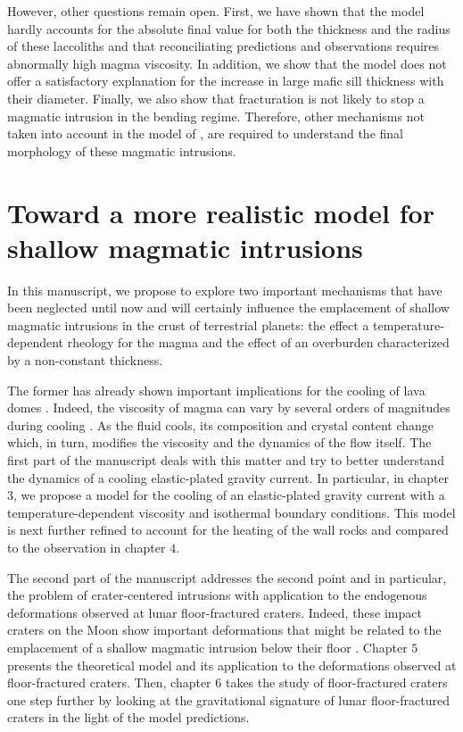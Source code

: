 However, other questions  remain open.  First, we have  shown that the
model  hardly accounts  for  the  absolute final  value  for both  the
thickness and the  radius of these laccoliths  and that reconciliating
predictions and observations requires abnormally high magma viscosity.
In addition,  we show  that the  model does  not offer  a satisfactory
explanation for the increase in  large mafic sill thickness with their
diameter. Finally,  we also  show that fracturation  is not  likely to
stop  a magmatic  intrusion in  the bending  regime. Therefore,  other
mechanisms    not   taken    into    account   in    the   model    of
\citet{Michaut:2011kg},   are  required   to   understand  the   final
morphology of these magmatic intrusions.

\section{Toward   a  more   realistic  model   for  shallow   magmatic
  intrusions}
\label{C2-sec:discussion}

In this  manuscript, we  propose to  explore two  important mechanisms
that have  been neglected until  now and will certainly  influence the
emplacement of shallow magmatic intrusions in the crust of terrestrial
planets: the effect a temperature-dependent rheology for the magma and
the effect of an overburden characterized by a non-constant thickness.

The former has already shown important implications for the cooling of
lava                                                             domes
\citep{Bercovici:2007vc,Bercovici:1996uu,BALMFORTH:1999ey,Garel:2014era}. Indeed,
the viscosity of magma can vary by several orders of magnitudes during
cooling \citep{Anonymous:CZVBrBvv,Lejeune:1995fc}. As the fluid cools,
its composition  and crystal content  change which, in  turn, modifies
the viscosity and the dynamics of  the flow itself.  The first part of
the manuscript deals with this matter and try to better understand the
dynamics of a cooling  elastic-plated gravity current.  In particular,
in  chapter   $3$,  we  propose  a   model  for  the  cooling   of  an
elastic-plated gravity current  with a temperature-dependent viscosity
and  isothermal  boundary  conditions.   This model  is  next  further
refined to account  for the heating of the wall  rocks and compared to
the observation in chapter $4$.

The second  part of the manuscript  addresses the second point  and in
particular, the problem of crater-centered intrusions with application
to  the  endogenous  deformations observed  at  lunar  floor-fractured
craters.   Indeed, these  impact craters  on the  Moon show  important
deformations that  might be  related to the  emplacement of  a shallow
magmatic intrusion below  their floor \citep{Schultz:1976kt}.  Chapter
$5$  presents  the  theoretical  model  and  its  application  to  the
deformations observed  at floor-fractured  craters. Then,  chapter $6$
takes the study of floor-fractured craters one step further by looking
at the gravitational signature of lunar floor-fractured craters in the
light of the model predictions.

